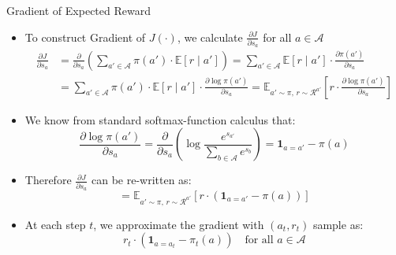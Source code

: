 \begin{frame}[shrink=20]{Gradient of Expected Reward}
\begin{itemize}
    \item To construct Gradient of $J(\cdot)$, we calculate $\frac{\partial J}{\partial s_a}$ for all $a \in \mathcal{A}$
    \begin{align*}
        \frac{\partial J}{\partial s_a}
        &= \frac{\partial}{\partial s_a}\!\left(\sum_{a' \in \mathcal{A}} \pi(a') \cdot \mathbb{E}[r \mid a']\right)
         = \sum_{a' \in \mathcal{A}} \mathbb{E}[r \mid a'] \cdot \frac{\partial \pi(a')}{\partial s_a} \\
        &= \sum_{a' \in \mathcal{A}} \pi(a') \cdot \mathbb{E}[r \mid a'] \cdot \frac{\partial \log \pi(a')}{\partial s_a}
         = \mathbb{E}_{a' \sim \pi, \, r \sim \mathcal{R}^{a'}}\!\left[r \cdot \frac{\partial \log \pi(a')}{\partial s_a}\right]
    \end{align*}
    \item We know from standard softmax-function calculus that:
    \[
        \frac{\partial \log \pi(a')}{\partial s_a} = \frac{\partial}{\partial s_a}\!\left(\log \frac{e^{s_{a'}}}{\sum_{b \in \mathcal{A}} e^{s_b}}\right) = \mathbf{1}_{a = a'} - \pi(a)
    \]
    \item Therefore $\frac{\partial J}{\partial s_a}$ can be re-written as:
    \[
        = \mathbb{E}_{a' \sim \pi, \, r \sim \mathcal{R}^{a'}}\!\left[r \cdot (\mathbf{1}_{a = a'} - \pi(a))\right]
    \]
    \item At each step $t$, we approximate the gradient with $(a_t, r_t)$ sample as:
    \[
        r_t \cdot (\mathbf{1}_{a = a_t} - \pi_t(a)) \quad \text{for all } a \in \mathcal{A}
    \]
\end{itemize}
\end{frame}

